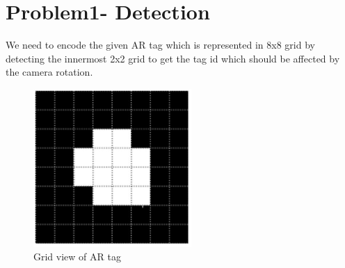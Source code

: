 \documentclass[12pt]{article}
\begin{document}

\tableofcontents
\pagebreak


\section{Problem1- Detection}
We need to encode the given AR tag which is represented in 8x8 grid by detecting the innermost 2x2 grid to get the tag id which should be affected by the camera rotation.
\begin{figure}[h]
    \centering
    \includegraphics[width=6cm]{artaggrid}
    \caption{Grid view of AR tag}
    \label{fig:artaggrid}
\end{figure}
\end{document}
